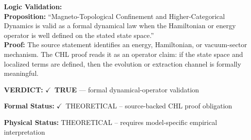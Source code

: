 \textbf{Logic Validation:}\\
\textbf{Proposition:} ``Magneto-Topological Confinement and Higher-Categorical Dynamics is valid as a formal
dynamical law when the Hamiltonian or energy operator is well defined on the stated
state space.''\\
\textbf{Proof:} The source statement identifies an energy, Hamiltonian, or vacuum-sector mechanism. The
CHL proof reads it as an operator claim: if the state space and localized terms are
defined, then the evolution or extraction channel is formally meaningful.

\textbf{VERDICT:} \ensuremath{\checkmark}\ \textbf{TRUE} --- formal dynamical-operator validation

\textbf{Formal Status:} \ensuremath{\checkmark}\ THEORETICAL -- source-backed CHL proof obligation

\textbf{Physical Status:} THEORETICAL -- requires model-specific empirical interpretation
\par\vspace{0.45em}
\par
\ifTZPDarkEdition
{}
\fi
\endgroup
\endgroup
